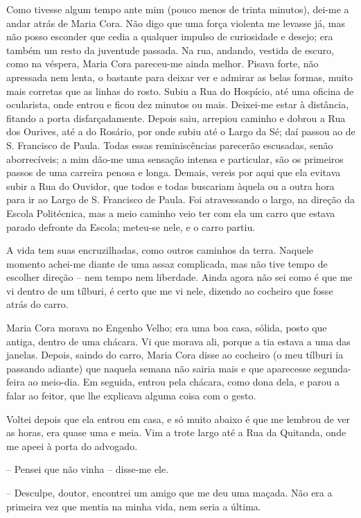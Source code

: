 Como tivesse algum tempo ante mim (pouco menos de trinta minutos),
dei-me a andar atrás de Maria Cora. Não digo que uma força violenta me
levasse já, mas não posso esconder que cedia a qualquer impulso de
curiosidade e desejo; era também um resto da juventude passada. Na rua,
andando, vestida de escuro, como na véspera, Maria Cora pareceu-me ainda
melhor. Pisava forte, não apressada nem lenta, o bastante para deixar
ver e admirar as belas formas, muito mais corretas que as linhas do
rosto. Subiu a Rua do Hospício, até uma oficina de ocularista, onde
entrou e ficou dez minutos ou mais. Deixei-me estar à distância, fitando
a porta disfarçadamente. Depois saiu, arrepiou caminho e dobrou a Rua
dos Ourives, até a do Rosário, por onde subiu até o Largo da Sé; daí
passou ao de S. Francisco de Paula. Todas essas reminiscências parecerão
escusadas, senão aborrecíveis; a mim dão-me uma sensação intensa e
particular, são os primeiros passos de uma carreira penosa e longa.
Demais, vereis por aqui que ela evitava subir a Rua do Ouvidor, que
todos e todas buscariam àquela ou a outra hora para ir ao Largo de S.
Francisco de Paula. Foi atravessando o largo, na direção da Escola
Politécnica, mas a meio caminho veio ter com ela um carro que estava
parado defronte da Escola; meteu-se nele, e o carro partiu.

A vida tem suas encruzilhadas, como outros caminhos da terra. Naquele
momento achei-me diante de uma assaz complicada, mas não tive tempo de
escolher direção -- nem tempo nem liberdade. Ainda agora não sei como é
que me vi dentro de um tílburi, é certo que me vi nele, dizendo ao
cocheiro que fosse atrás do carro.

Maria Cora morava no Engenho Velho; era uma boa casa, sólida, posto que
antiga, dentro de uma chácara. Vi que morava ali, porque a tia estava a
uma das janelas. Depois, saindo do carro, Maria Cora disse ao cocheiro
(o meu tílburi ia passando adiante) que naquela semana não sairia mais e
que aparecesse segunda-feira ao meio-dia. Em seguida, entrou pela
chácara, como dona dela, e parou a falar ao feitor, que lhe explicava
alguma coisa com o gesto.

Voltei depois que ela entrou em casa, e só muito abaixo é que me lembrou
de ver as horas, era quase uma e meia. Vim a trote largo até a Rua da
Quitanda, onde me apeei à porta do advogado.

-- Pensei que não vinha -- disse-me ele.

-- Desculpe, doutor, encontrei um amigo que me deu uma maçada. Não era a
primeira vez que mentia na minha vida, nem seria a última.

